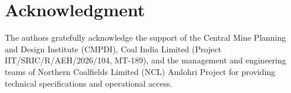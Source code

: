 \documentclass[journal]{IEEEtran}
\begin{document}
\section*{Acknowledgment}
The authors gratefully acknowledge the support of the Central Mine Planning and Design Institute (CMPDI), Coal India Limited (Project IIT/SRIC/R/AEH/2026/104, MT-189), and the management and engineering teams of Northern Coalfields Limited (NCL) Amlohri Project for providing technical specifications and operational access.



\end{document}
